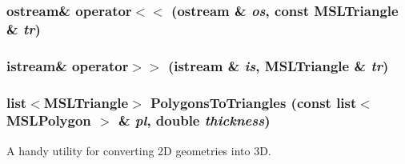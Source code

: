 \subsubsection{\setlength{\rightskip}{0pt plus 5cm}ostream\& operator$<$$<$ (ostream \& {\em os}, const {\bf MSLTriangle} \& {\em tr})}\label{triangle_8h_a1}


\subsubsection{\setlength{\rightskip}{0pt plus 5cm}istream\& operator$>$$>$ (istream \& {\em is}, {\bf MSLTriangle} \& {\em tr})}\label{triangle_8h_a0}


\subsubsection{\setlength{\rightskip}{0pt plus 5cm}list$<${\bf MSLTriangle}$>$ Polygons\-To\-Triangles (const list$<$ {\bf MSLPolygon} $>$ \& {\em pl}, double {\em thickness})}\label{triangle_8h_a2}


A handy utility for converting 2D geometries into 3D.

